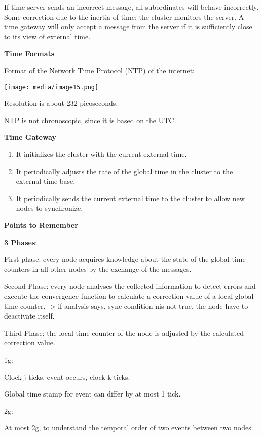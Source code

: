If time server sends an incorrect message, all subordinates will behave
incorrectly. Some correction due to the inertia of time: the cluster
monitors the server. A time gateway will only accept a message from the
server if it is sufficiently close to its view of external time.

\textbf{Time Formats}

Format of the Network Time Protocol (NTP) of the internet:

\texttt{[image: media/image15.png]}

Resolution is about 232 picoseconds.

NTP is not chronoscopic, since it is based on the UTC.

\textbf{Time Gateway}

\begin{enumerate}
\def\labelenumi{\arabic{enumi}.}
\item
  It initializes the cluster with the current external time.
\item
  It periodically adjusts the rate of the global time in the cluster to
  the external time base.
\item
  It periodically sends the current external time to the cluster to
  allow new nodes to synchronize.
\end{enumerate}

\protect\hypertarget{teil8}{}{}\textbf{Points to Remember}

\textbf{3 Phases}:

First phase: every node acquires knowledge about the state of the global
time counters in all other nodes by the exchange of the messages.

Second Phase: every node analyses the collected information to detect
errors and execute the convergence function to calculate a correction
value of a local global time counter. -\textgreater{} if analysis says,
sync condition nis not true, the node have to deactivate itself.

Third Phase: the local time counter of the node is adjusted by the
calculated correction value.

1g:

Clock j ticks, event occurs, clock k ticks.

Global time stamp for event can differ by at most 1 tick.

2g:

At most 2g, to understand the temporal order of two events between two
nodes.

